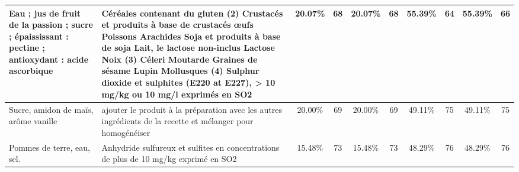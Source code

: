 \begin{tabular}{p{5cm}p{5cm}cccccccc}
                                                                                                                                                                                       Eau ; jus de fruit de la passion ; sucre ; épaississant : pectine ; antioxydant : acide ascorbique &  Céréales contenant du gluten (2)  \newline Crustacés et produits à base de crustacés  \newline œufs  \newline Poissons  \newline Arachides  \newline Soja et produits à base de soja  \newline Lait, le lactose non-inclus  \newline Lactose  \newline Noix  (3)  \newline Céleri  \newline Moutarde  \newline Graines de sésame  \newline Lupin  \newline Mollusques  (4)  \newline Sulphur dioxide et sulphites (E220 at E227), > 10  \newline mg/kg ou 10 mg/l exprimés en SO2  &  20.07\% &   68 &  20.07\% &   68 &  55.39\% &   64 &   55.39\% &   66 \\ \hline
                                                                                                                                                                                                                                                     Sucre, amidon de maïs, arôme vanille &                                                                                                                                                                                                                                                 ajouter le produit à la préparation avec les autres ingrédients de la recette et mélanger pour homogénéiser &  20.00\% &   69 &  20.00\% &   69 &  49.11\% &   75 &   49.11\% &   75 \\ \hline
                                                                                                                                                                                                                                                               Pommes de terre, eau, sel. &                                                                                                                                                                                                                                                                    Anhydride sulfureux et sulfites en  \newline concentrations de plus de 10 mg/kg  \newline exprimé en SO2 &  15.48\% &   73 &  15.48\% &   73 &  48.29\% &   76 &   48.29\% &   76 \\ \hline

\end{tabular}
